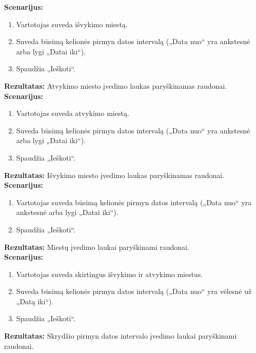 \documentclass{VUMIFPSkursinis}
\begin{document}
            \noindent\textbf{Scenarijus:}
                \begin{enumerate}
                    \item Vartotojas suveda išvykimo miestą.
                    \item Suveda būsimą kelionės pirmyn datos intervalą („Data nuo“ yra ankstesnė arba lygi „Datai iki“).
                    \item Spaudžia „Ieškoti“.
                \end{enumerate}
            \textbf{Rezultatas:} Atvykimo miesto įvedimo laukas paryškinamas raudonai.\\
            
            \noindent\textbf{Scenarijus:}
                \begin{enumerate}
                    \item Vartotojas suveda atvykimo miestą.
                    \item Suveda būsimą kelionės pirmyn datos intervalą („Data nuo“ yra ankstesnė arba lygi „Datai iki“).
                    \item Spaudžia „Ieškoti“.
                \end{enumerate}
            \textbf{Rezultatas:} Išvykimo miesto įvedimo laukas paryškinamas raudonai.\\
            
            \noindent\textbf{Scenarijus:}
                \begin{enumerate}
                    \item Vartotojas suveda būsimą kelionės pirmyn datos intervalą („Data nuo“ yra ankstesnė arba lygi „Datai iki“).
                    \item Spaudžia „Ieškoti“.
                \end{enumerate}
            \textbf{Rezultatas:} Miestų įvedimo laukai paryškinami raudonai.\\
            
            \noindent\textbf{Scenarijus:}
                \begin{enumerate}
                    \item Vartotojas suveda skirtingus išvykimo ir atvykimo miestus.
                    \item Suveda būsimą kelionės pirmyn datos intervalą („Data nuo“ yra vėlesnė už „Datą iki“).
                    \item Spaudžia „Ieškoti“.
                \end{enumerate}
            \textbf{Rezultatas:} Skrydžio pirmyn datos intervalo įvedimo laukai paryškinami raudonai.\\
            
\end{document}

